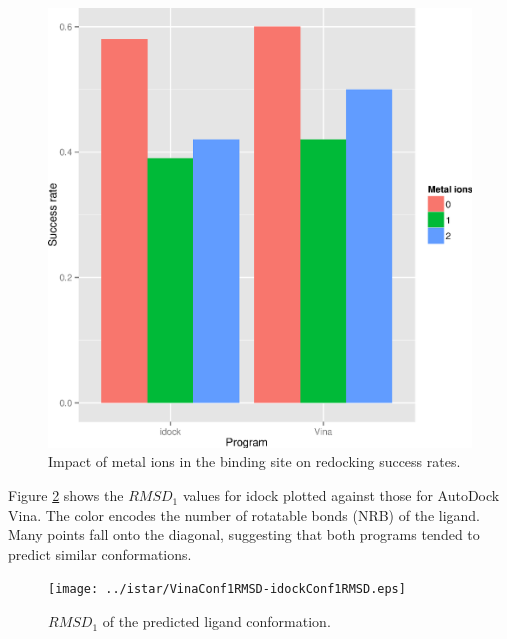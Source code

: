\begin{figure}
\begin{center}
\includegraphics[width=\linewidth]{../istar/Program-NIONS.eps}
\end{center}
\caption{Impact of metal ions in the binding site on redocking success rates.}
\label{istar:Program-NIONS}
\end{figure}

Figure \ref{istar:VinaConf1RMSD-idockConf1RMSD} shows the $RMSD_1$ values for idock plotted against those for AutoDock Vina. The color encodes the number of rotatable bonds (NRB) of the ligand. Many points fall onto the diagonal, suggesting that both programs tended to predict similar conformations.

\begin{figure}
\begin{center}
\texttt{[image: ../istar/VinaConf1RMSD-idockConf1RMSD.eps]}
\end{center}
\caption{$RMSD_1$ of the predicted ligand conformation.}
\label{istar:VinaConf1RMSD-idockConf1RMSD}
\end{figure}

